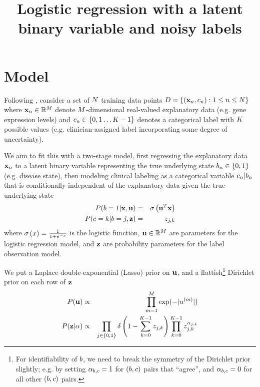 \documentclass{article}
\begin{document}

\title{Logistic regression with a latent binary variable and noisy labels}

\maketitle

\section{Model}

Following \cite{BootkrajangKaban2012},
consider a set of $N$ training data points
$D = \left\{ ({\bf x}_{n},c_{n}): 1 \leq n \leq N \right\}$
where
${\bf x}_n \in \mathbb{R}^M$
denote $M$-dimensional real-valued explanatory data (e.g. gene expression levels)
and
$c_n \in \left\{ 0, 1 \ldots K - 1 \right\}$
denotes a categorical label with $K$ possible values
(e.g. clinician-assigned label incorporating some degree of uncertainty).

We aim to fit this with a two-stage model,
first regressing the explanatory data ${\bf x}_n$ to a latent binary variable representing the true underlying state
$b_n \in \left\{ 0, 1 \right\}$
(e.g. disease state),
then modeling clinical labeling as a categorical variable $c_n | b_n$
that is conditionally-independent of the explanatory data given the true underlying state
\begin{eqnarray*}
P(b = 1 | {\bf x}, {\bf u}) & = & \sigma\left({\bf u}^T {\bf x}\right) \\
P(c = k | b = j, {\bf z}) & = & z_{j,k}
\end{eqnarray*}
where
$\sigma\left(x\right) = \frac{1}{1+e^{-x}}$ is the logistic function,
${\bf u} \in \mathbb{R}^M$ are parameters for the logistic regression model, and
${\bf z}$ are probability parameters for the label observation model.

We put a Laplace double-exponential (Lasso) prior on ${\bf u}$, and a flattish\footnote{
  For identifiability of $b$, we need to break the symmetry of the Dirichlet prior slightly;
  e.g. by setting $\alpha_{b,c} = 1$ for $(b,c)$ pairs that ``agree'',
  and $\alpha_{b,c} = 0$ for all other $(b,c)$ pairs.
} Dirichlet prior on each row of ${\bf z}$
\begin{eqnarray*}
P({\bf u}) & \propto & \prod_{m=1}^{M} \exp(-|u^{(m)}|) \\
P({\bf z}|\alpha) & \propto & \prod_{j \in \{0,1\}} \delta \left( 1 - \sum_{k=0}^{K-1} z_{j,k} \right)
\prod_{k=0}^{K-1} z_{j,k}^{\alpha_{j,k}}
\end{eqnarray*}
\end{document}
